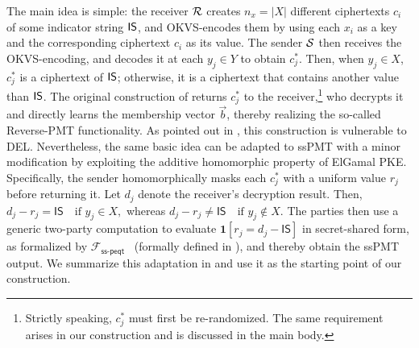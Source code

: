 The main idea is simple: the receiver $\mathcal{R}$ creates $n_x = |X|$ different ciphertexts $c_i$ of some indicator string ${\sf IS}$, and OKVS-encodes them by using each $x_i$ as a key and the corresponding ciphertext $c_i$ as its value. The sender $\mathcal{S}$ then receives the OKVS-encoding, and decodes it at each $y_j \in Y$ to obtain $c_j^*$. Then, when $y_j \in X$, $c_j^*$ is a ciphertext of ${\sf IS}$; otherwise, it is a ciphertext that contains another value than ${\sf IS}$. 
The original construction of \cite{ZCL+23} returns $c_j^*$ to the receiver,\footnote{Strictly speaking, $c_j^*$ must
first be re-randomized. The same requirement arises in our construction and is discussed in the main body.} who decrypts it and directly learns the membership vector $\vec b$, thereby realizing the so-called Reverse-PMT functionality. As pointed out in \cite{JSZG24,TBZ+25}, this construction is vulnerable to DEL. 
Nevertheless, the same basic idea can be adapted to ssPMT with a minor modification by exploiting the additive homomorphic property of ElGamal PKE.
Specifically, the sender homomorphically masks each $c_j^*$ with a uniform value $r_j$ before returning it. 
Let $d_j$ denote the receiver's decryption result. Then, $ d_j-r_j=\mathsf{IS} \quad\text{if }y_j\in X,$ whereas $d_j-r_j\neq\mathsf{IS} \quad\text{if }y_j\notin X.$
The parties then use a generic two-party computation to evaluate $\mathbf{1}[r_j=d_j-\mathsf{IS}]$ in secret-shared form, as formalized by $\mathcal{F}_{\mathsf{ss\mbox{-}peqt}}$~\cite{TBZ+25} (formally defined in ), and thereby obtain the ssPMT output. We summarize this adaptation in  and use it as the starting point of our construction.



